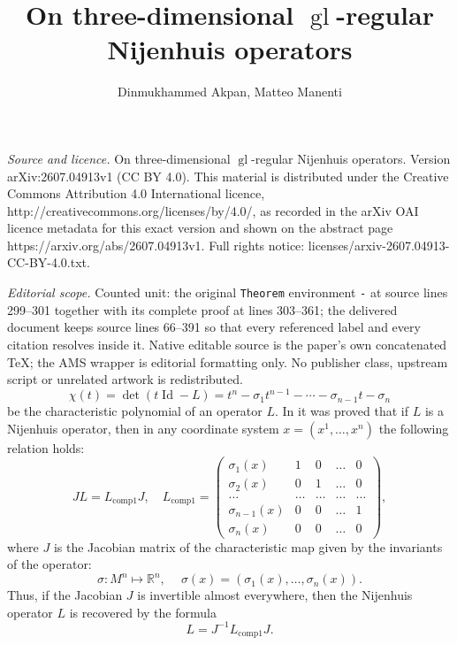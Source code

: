 \documentclass[10pt,a4paper]{amsart}
\begin{document}
\title[On three-dimensional operatornamegl-regular Nijenhuis operat]{On three-dimensional $\operatorname{gl}$-regular Nijenhuis operators}
\author{Dinmukhammed Akpan, Matteo Manenti}
\date{}
\maketitle
\noindent\emph{Source and licence.} On three-dimensional $\operatorname{gl}$-regular Nijenhuis operators. Version arXiv:2607.04913v1 (CC BY 4.0). This material is distributed under the Creative Commons Attribution 4.0 International licence, http://creativecommons.org/licenses/by/4.0/, as recorded in the arXiv OAI licence metadata for this exact version and shown on the abstract page https://arxiv.org/abs/2607.04913v1. Full rights notice: licenses/arxiv-2607.04913-CC-BY-4.0.txt.\par\smallskip
\noindent\textit{Editorial scope.} Counted unit: the original \texttt{Theorem} environment \texttt{-} at source lines 299--301 together with its complete proof at lines 303--361; the delivered document keeps source lines 66--391 so that every referenced label and every citation resolves inside it. Native editable source is the paper's own concatenated TeX; the AMS wrapper is editorial formatting only. No publisher class, upstream script or unrelated artwork is redistributed.
\begin{equation} \label{eq: char pol gen}
    \chi(t)=\det(t\operatorname{Id}-L)=t^n-\sigma_1 t^{n-1}-\cdots-\sigma_{n-1}t-\sigma_n
\end{equation}
be the characteristic polynomial of an operator $L$. In \cite{bolsinov2022nijenhuisNGI} it was proved that if $L$ is a Nijenhuis operator, then in any  coordinate system $x=(x^1,\ldots,x^n)$ the following relation holds:
\begin{equation}\label{ngi form}
    J L = L_{\operatorname{comp1}} J, \quad 
    L_{\operatorname{comp1}} = \begin{pmatrix}
        \sigma_1(x) & 1 & 0 & \ldots & 0 \\
        \sigma_2(x) & 0 & 1 & \ldots & 0 \\
        \ldots & \ldots & \ldots & \ldots & \ldots \\
        \sigma_{n-1}(x) & 0 & 0 & \ldots & 1 \\
        \sigma_n(x) & 0 & 0 & \ldots & 0
    \end{pmatrix},
\end{equation}
where $J$ is the Jacobian matrix of the characteristic map given by the invariants of the operator:
\[
\sigma : M^n \mapsto \mathbb{R}^n, \quad  \
\sigma(x) = (\sigma_1(x),\ldots,\sigma_n(x)).
\]
Thus, if the Jacobian $J$ is invertible almost everywhere, then the Nijenhuis operator $L$ is recovered by the formula
\begin{equation}\label{reconst form}
    L = J^{-1} L_{\operatorname{comp1}} J.
\end{equation}
\end{document}
